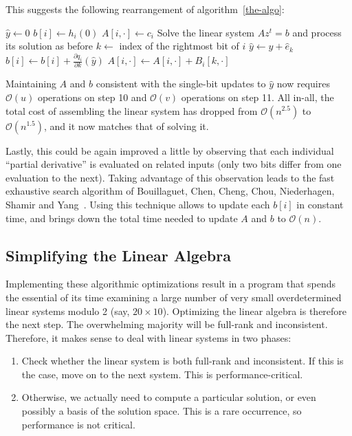 \documentclass[a4paper,UKenglish,cleveref, autoref]{lipics-v2019}
\newcommand{\bigO}[1]{\ensuremath{\mathcal{O}\left( #1 \right)} }
\begin{document}
This suggests the following rearrangement of algorithm~\ref{the-algo}:

\begin{algorithmic}[1]
  \State $\hat y \gets 0$ 
  \State $b[i] \gets  h_i(0)$
  \State $A[i, \cdot] \gets c_i$
  \EndFor
   
  \State Solve the linear system $Az^t = b$ and process its solution as before
  \State $k \gets $ index of the rightmost bit of $i$ 
  \State $\hat y \gets \hat y + \hat e_k$
   
  \State $b[i] \gets b[i] + \frac{\partial q_i}{\partial k}(\hat y)$
  \State $A[i, \cdot] \gets A[i, \cdot] + B_i[k, \cdot]$
  \EndFor
  \EndFor
\end{algorithmic}

Maintaining $A$ and $b$ consistent with the single-bit updates to $\hat y$ now
requires $\bigO{u}$ operations on step 10 and $\bigO{v}$ operations on step
11. All in-all, the total cost of assembling the linear system has dropped from
$\bigO{n^{2.5}}$ to $\bigO{n^{1.5}}$, and it now matches that of solving it.

Lastly, this could be again improved a little by observing that each individual
``partial derivative'' is evaluated on related inputs (only two bits differ from
one evaluation to the next). Taking advantage of this observation leads to the
fast exhaustive search algorithm of Bouillaguet, Chen, Cheng, Chou, Niederhagen,
Shamir and Yang~\cite{BouillaguetCCCNSY10}. Using this technique allows to
update each $b[i]$ in constant time, and brings down the total time needed to
update $A$ and $b$ to $\bigO{n}$.

\subsection{Simplifying the Linear Algebra}

Implementing these algorithmic optimizations result in a program that spends the
essential of its time examining a large number of very small overdetermined
linear systems modulo 2 (say, $20 \times 10$). Optimizing the linear algebra is
therefore the next step. The overwhelming majority will be full-rank and
inconsistent. Therefore, it makes sense to deal with linear systems in two
phases:
\begin{enumerate}
\item Check whether the linear system is both full-rank and inconsistent. If
  this is the case, move on to the next system. This is performance-critical.
\item Otherwise, we actually need to compute a particular solution, or even
  possibly a basis of the solution space. This is a rare occurrence, so
  performance is not critical.
\end{enumerate}
\end{document}
